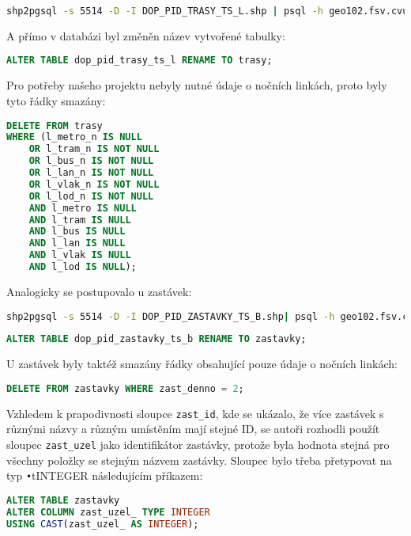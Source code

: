 \documentclass[a4paper, 12pt]{article}
\begin{document}
\begin{lstlisting}[language=bash]
shp2pgsql -s 5514 -D -I DOP_PID_TRASY_TS_L.shp | psql -h geo102.fsv.cvut.cz -d pgis_uzpd -U uzpd18_a
\end{lstlisting} 
 
A přímo v databázi byl změněn název vytvořené tabulky:

\begin{lstlisting}[language=sql]
ALTER TABLE dop_pid_trasy_ts_l RENAME TO trasy;
\end{lstlisting} 

Pro potřeby našeho projektu nebyly nutné údaje o nočních linkách, proto byly tyto řádky smazány: 
\begin{lstlisting}[language=sql]
DELETE FROM trasy 
WHERE (l_metro_n IS NULL
	OR l_tram_n IS NOT NULL
	OR l_bus_n IS NOT NULL
	OR l_lan_n IS NOT NULL
	OR l_vlak_n IS NOT NULL
	OR l_lod_n IS NOT NULL
	AND l_metro IS NULL
	AND l_tram IS NULL
	AND l_bus IS NULL
	AND l_lan IS NULL 
	AND l_vlak IS NULL 
	AND l_lod IS NULL);
\end{lstlisting} 

Analogicky se postupovalo u zastávek:

\begin{lstlisting}[language=bash]
shp2pgsql -s 5514 -D -I DOP_PID_ZASTAVKY_TS_B.shp| psql -h geo102.fsv.cvut.cz -d pgis_uzpd -U uzpd18_a
\end{lstlisting} 

\begin{lstlisting}[language=sql]
ALTER TABLE dop_pid_zastavky_ts_b RENAME TO zastavky;
\end{lstlisting} 

U zastávek byly taktéž smazány řádky obsahující pouze údaje o nočních linkách:
\begin{lstlisting}[language=sql]
DELETE FROM zastavky WHERE zast_denno = 2;
\end{lstlisting} 

Vzhledem k prapodivnosti sloupce \texttt{zast\_id}, kde se ukázalo, že více zastávek s různými názvy a různým umístěním mají stejné ID, se autoři rozhodli použít sloupec \texttt{zast\_uzel} jako identifikátor zastávky, protože byla hodnota stejná pro všechny položky se stejným názvem zastávky. Sloupec bylo třeba přetypovat na typ \texttt{•}t{INTEGER} následujícím příkazem: 

\begin{lstlisting}[language=sql]
ALTER TABLE zastavky 
ALTER COLUMN zast_uzel_ TYPE INTEGER 
USING CAST(zast_uzel_ AS INTEGER);
\end{lstlisting} 
\end{document}
